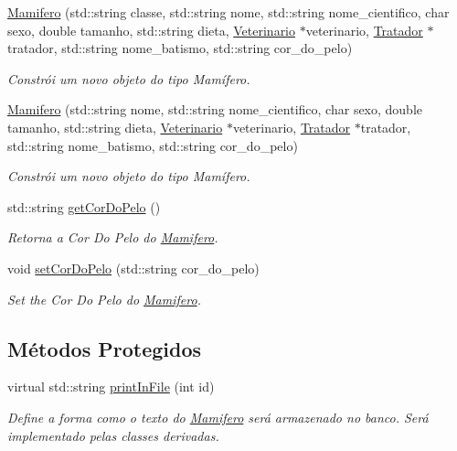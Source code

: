 \begin{DoxyCompactItemize}
\hyperlink{classMamifero_aea0221cb04420d0d4565d9387b7f1b72}{Mamifero} (std\+::string classe, std\+::string nome, std\+::string nome\+\_\+cientifico, char sexo, double tamanho, std\+::string dieta, \hyperlink{classVeterinario}{Veterinario} $\ast$veterinario, \hyperlink{classTratador}{Tratador} $\ast$tratador, std\+::string nome\+\_\+batismo, std\+::string cor\+\_\+do\+\_\+pelo)
\begin{DoxyCompactList}\small\item\em Constrói um novo objeto do tipo Mamífero. \end{DoxyCompactList}\item 
\hyperlink{classMamifero_a9d45fdc114bc1be47cc9d02e39ec59bd}{Mamifero} (std\+::string nome, std\+::string nome\+\_\+cientifico, char sexo, double tamanho, std\+::string dieta, \hyperlink{classVeterinario}{Veterinario} $\ast$veterinario, \hyperlink{classTratador}{Tratador} $\ast$tratador, std\+::string nome\+\_\+batismo, std\+::string cor\+\_\+do\+\_\+pelo)
\begin{DoxyCompactList}\small\item\em Constrói um novo objeto do tipo Mamífero. \end{DoxyCompactList}\item 
std\+::string \hyperlink{classMamifero_a7bf7c25d72549218df4472922ed365de}{get\+Cor\+Do\+Pelo} ()
\begin{DoxyCompactList}\small\item\em Retorna a Cor Do Pelo do \hyperlink{classMamifero}{Mamifero}. \end{DoxyCompactList}\item 
void \hyperlink{classMamifero_af05676a74084b69250490febcff69751}{set\+Cor\+Do\+Pelo} (std\+::string cor\+\_\+do\+\_\+pelo)
\begin{DoxyCompactList}\small\item\em Set the Cor Do Pelo do \hyperlink{classMamifero}{Mamifero}. \end{DoxyCompactList}\end{DoxyCompactItemize}
\subsection*{Métodos Protegidos}
\begin{DoxyCompactItemize}
\item 
virtual std\+::string \hyperlink{classMamifero_a88e6c2efe9180611486f82d4dbf308ba}{print\+In\+File} (int id)
\begin{DoxyCompactList}\small\item\em Define a forma como o texto do \hyperlink{classMamifero}{Mamifero} será armazenado no banco. Será implementado pelas classes derivadas. \end{DoxyCompactList}\end{DoxyCompactItemize}
